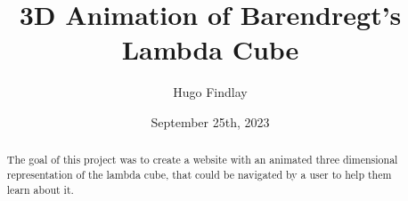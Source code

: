 \documentclass{l4proj}
\begin{document}
\title{3D Animation of Barendregt's Lambda Cube}
\author{Hugo Findlay}
\date{September 25th, 2023}

\maketitle

\begin{abstract}
    The goal of this project was to create a website with an animated three dimensional representation of the lambda cube, that could be navigated by a user to help them learn about it.
    
\end{abstract}


%
%
\def\consentname {Hugo Findlay} %
\def\consentdate {14 February 2024} %
%
\educationalconsent


\tableofcontents
\end{document}
